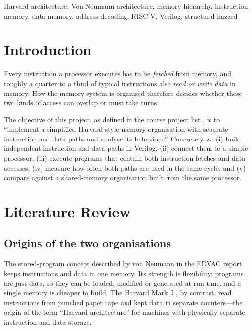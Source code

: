 \documentclass[conference]{IEEEtran}
\begin{document}
\begin{IEEEkeywords}
Harvard architecture, Von Neumann architecture, memory hierarchy,
instruction memory, data memory, address decoding, RISC-V, Verilog, structural hazard
\end{IEEEkeywords}

\section{Introduction}
Every instruction a processor executes has to be \emph{fetched} from memory,
and roughly a quarter to a third of typical instructions also \emph{read or
write data} in memory. How the memory system is organised therefore decides
whether these two kinds of access can overlap or must take turns.

The objective of this project, as defined in the course project list
\cite{mca_projects}, is to ``implement a simplified Harvard-style memory
organisation with separate instruction and data paths and analyse its
behaviour''. Concretely we (i) build independent instruction and data paths
in Verilog, (ii) connect them to a simple processor, (iii) execute programs
that contain both instruction fetches and data accesses, (iv) measure how
often both paths are used in the same cycle, and (v) compare against a
shared-memory organisation built from the same processor.

\section{Literature Review}

\subsection{Origins of the two organisations}
The stored-program concept described by von Neumann in the EDVAC report
\cite{vonneumann1945} keeps instructions and data in one memory. Its strength
is flexibility: programs are just data, so they can be loaded, modified or
generated at run time, and a single memory is cheaper to build. The Harvard
Mark~I \cite{aiken1946}, by contrast, read instructions from punched paper
tape and kept data in separate counters---the origin of the term
``Harvard architecture'' for machines with physically separate instruction
and data storage.
\end{document}

